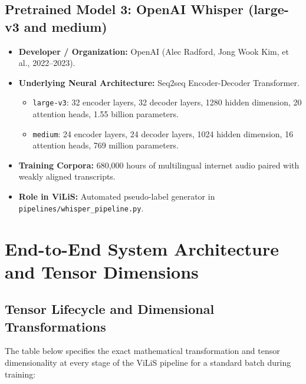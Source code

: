 \documentclass[11pt,a4paper]{report}
\begin{document}
\section{Pretrained Model 3: OpenAI Whisper (large-v3 and medium)}
\begin{itemize}
    \item \textbf{Developer / Organization:} OpenAI (Alec Radford, Jong Wook Kim, et al., 2022--2023).
    \item \textbf{Underlying Neural Architecture:} Seq2seq Encoder-Decoder Transformer.
    \begin{itemize}
        \item \texttt{large-v3}: 32 encoder layers, 32 decoder layers, 1280 hidden dimension, 20 attention heads, 1.55 billion parameters.
        \item \texttt{medium}: 24 encoder layers, 24 decoder layers, 1024 hidden dimension, 16 attention heads, 769 million parameters.
    \end{itemize}
    \item \textbf{Training Corpora:} 680,000 hours of multilingual internet audio paired with weakly aligned transcripts.
    \item \textbf{Role in ViLiS:} Automated pseudo-label generator in \texttt{pipelines/whisper\_pipeline.py}.
\end{itemize}

\chapter{End-to-End System Architecture and Tensor Dimensions}

\section{Tensor Lifecycle and Dimensional Transformations}
The table below specifies the exact mathematical transformation and tensor dimensionality at every stage of the ViLiS pipeline for a standard batch during training:
\end{document}

